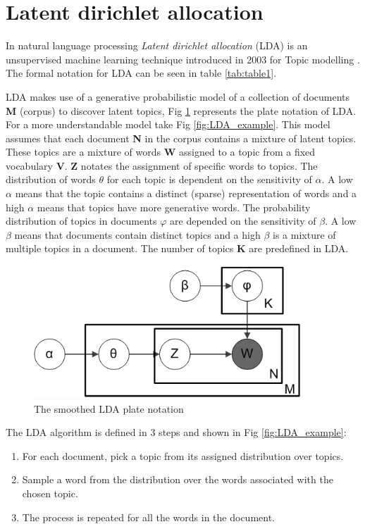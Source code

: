 \section{Latent dirichlet allocation}
In natural language processing \textit{Latent dirichlet allocation} (LDA) is an unsupervised machine learning technique introduced in 2003 for Topic modelling \cite{Blei2003LatentAllocation}. The formal notation for LDA can be seen in table \ref{tab:table1}.

LDA makes use of a generative probabilistic model of a collection of documents \textbf{M} (corpus) to discover latent topics, Fig \ref{fig:LDA} represents the plate notation of LDA. For a more understandable model take Fig \ref{fig:LDA_example}. This model assumes that each document \textbf{N} in the corpus contains a mixture of latent topics. These topics are a mixture of words \textbf{W} assigned to a topic from a fixed vocabulary \textbf{V}. \textbf{Z} notates the assignment of specific words to topics. The distribution of words $\theta$ for each topic is dependent on the sensitivity of $\alpha$. A low $\alpha$ means that the topic contains a distinct (sparse) representation of words and a high $\alpha$ means that topics have more generative words. The probability distribution of topics in documents $\varphi$ are depended on the sensitivity of $\beta$. A low $\beta$ means that documents contain distinct topics and a high $\beta$ is a mixture of multiple topics in a document. The number of topics \textbf{K} are predefined in LDA. 

\begin{figure}
    \centering
    \includegraphics[width=10cm, height=5cm]{methodology/Smoothed_LDA.png}
    \caption{The smoothed LDA plate notation}
    \label{fig:LDA}
\end{figure}

The LDA algorithm is defined in 3 steps and shown in Fig \ref{fig:LDA_example}:
\begin{enumerate}
    \item For each document, pick a topic from its assigned distribution over topics.
    \item Sample a word from the distribution over the words associated with the chosen topic. 
    \item  The process is repeated for all the words in the document.
\end{enumerate}

